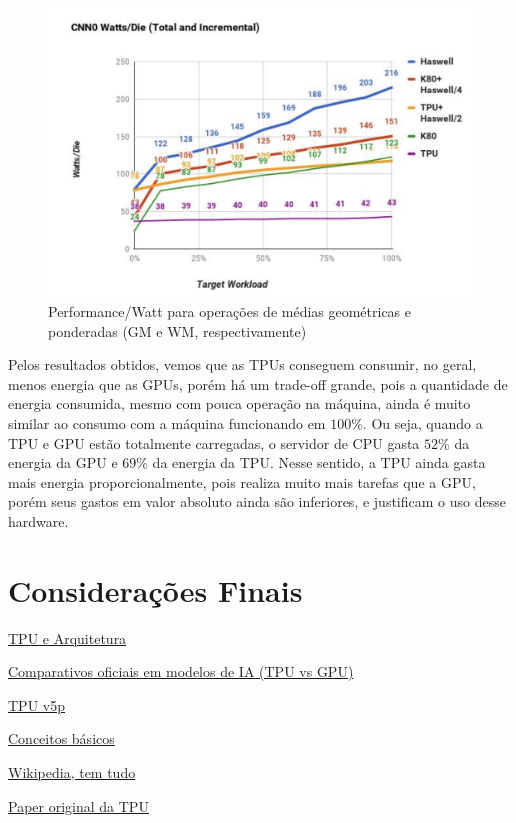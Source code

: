 \documentclass{report}
\begin{document}
\begin{figure}[h]
	\includegraphics[scale=0.5]{watts-die}
	\centering
	\caption{Performance/Watt para operações de médias geométricas e ponderadas (GM e WM, respectivamente)}
\end{figure}


Pelos resultados obtidos, vemos que as TPUs conseguem consumir, no geral, menos energia que as GPUs, porém há um trade-off grande, pois a quantidade de energia consumida, mesmo com pouca operação na máquina, ainda é muito similar ao consumo com a máquina funcionando em $100\%$. Ou seja, quando a TPU e GPU estão totalmente carregadas, o servidor de CPU gasta $52\%$ da energia da GPU e $69\%$ da energia da TPU. Nesse sentido, a TPU ainda gasta mais energia proporcionalmente, pois realiza muito mais tarefas que a GPU, porém seus gastos em valor absoluto ainda são inferiores, e justificam o uso desse hardware.

\chapter{Considerações Finais}




\href{https://www.run.ai/guides/cloud-deep-learning/google-tpu}{TPU e Arquitetura}

\href{https://cloud.google.com/blog/products/compute/performance-per-dollar-of-gpus-and-tpus-for-ai-inference}{Comparativos oficiais em modelos de IA (TPU vs GPU)}

\href{https://canaltech.com.br/inteligencia-artificial/cloud-tpu-v5p-e-o-novo-e-mais-poderoso-acelerador-de-ia-do-google-272299/}{TPU v5p}

\href{https://cloud.google.com/tpu?hl=pt-BR}{Conceitos básicos}

\href{https://en.wikipedia.org/wiki/Tensor_Processing_Unit}{Wikipedia, tem tudo}

\href{https://arxiv.org/pdf/1704.04760}{Paper original da TPU}
\end{document}
